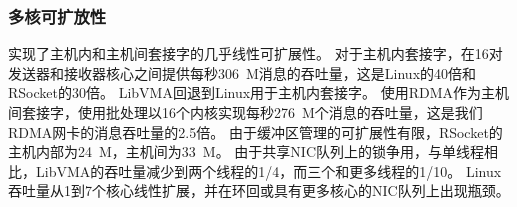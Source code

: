 \subsubsection{多核可扩放性}





\sys 实现了主机内和主机间套接字的几乎线性可扩展性。
对于主机内套接字，\sys 在16对发送器和接收器核心之间提供每秒306~M消息的吞吐量，这是Linux的40倍和RSocket的30倍。
LibVMA回退到Linux用于主机内套接字。
使用RDMA作为主机间套接字，\sys 使用批处理以16个内核实现每秒276~M个消息的吞吐量，这是我们RDMA网卡的消息吞吐量的2.5倍。
由于缓冲区管理的可扩展性有限，RSocket的主机内部为24~M，主机间为33~M。
由于共享NIC队列上的锁争用，与单线程相比，LibVMA的吞吐量减少到两个线程的1/4，而三个和更多线程的1/10。
Linux吞吐量从1到7个核心线性扩展，并在环回或具有更多核心的NIC队列上出现瓶颈。



